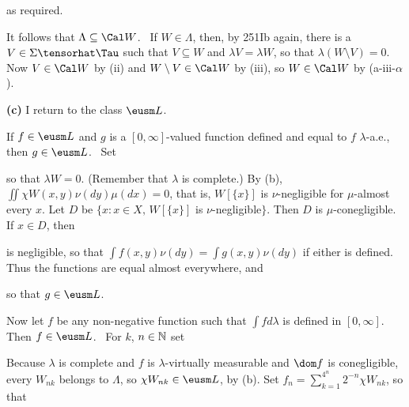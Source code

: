 {

\noindent as required.\ \Qed

\medskip

 It follows that $\Lambda\subseteq\Cal W$.   \Prf\ If
$W\in\Lambda$, then, by 251Ib again, there is a
$V\in\Sigma\tensorhat\Tau$ such that $V\subseteq W$ and
$\lambda V=\lambda W$, so that $\lambda(W\setminus V)=0$.   Now
$V\in\Cal W$ by
(ii) and $W\setminus V\in\Cal W$ by (iii), so $W\in\Cal W$ by
(a-iii-$\alpha$).\ \Qed

\medskip

{\bf (c)} I return to the class $\eusm L$.

\medskip

 If $f\in\eusm L$ and $g$ is a $[0,\infty]$-valued
function defined and equal to $f\,\,\lambda$-a.e., then $g\in\eusm L$.
\Prf\ Set


\noindent so that $\lambda W=0$.   (Remember that $\lambda$ is
complete.)   By (b), $\iint\chi W(x,y)\nu(dy)\mu(dx)=0$, that is,
$W[\{x\}]$ is $\nu$-negligible for $\mu$-almost every $x$.   Let $D$ be
$\{x:x\in X,\,W[\{x\}]$ is $\nu$-negligible$\}$.   Then $D$ is
$\mu$-conegligible.   If $x\in D$, then


\noindent is negligible, so that $\int f(x,y)\nu(dy)=\int g(x,y)\nu(dy)$
if either is defined.   Thus the functions
are equal almost everywhere, and


\noindent so that $g\in\eusm L$.\ \Qed

\medskip

 Now let $f$ be any non-negative function such that
$\int fd\lambda$ is defined in $[0,\infty]$.  Then $f\in\eusm L$.
\Prf\ For $k$, $n\in\Bbb N$ set


\noindent Because $\lambda$ is complete and $f$ is $\lambda$-virtually
measurable and $\dom f$ is conegligible, every $W_{nk}$ belongs to
$\Lambda$, so $\chi W_{nk}\in\eusm L$, by (b).   Set
$f_n=\sum_{k=1}^{4^n}2^{-n}\chi W_{nk}$, so that

}
